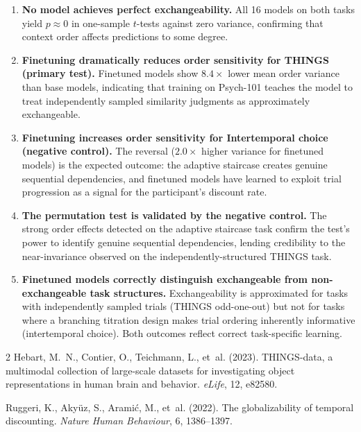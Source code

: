 \documentclass[11pt]{article}
\begin{document}
\begin{enumerate}
    \item \textbf{No model achieves perfect exchangeability.} All 16 models on both tasks yield $p \approx 0$ in one-sample $t$-tests against zero variance, confirming that context order affects predictions to some degree.

    \item \textbf{Finetuning dramatically reduces order sensitivity for THINGS (primary test).} Finetuned models show $8.4\times$ lower mean order variance than base models, indicating that training on Psych-101 teaches the model to treat independently sampled similarity judgments as approximately exchangeable.

    \item \textbf{Finetuning increases order sensitivity for Intertemporal choice (negative control).} The reversal ($2.0\times$ higher variance for finetuned models) is the expected outcome: the adaptive staircase creates genuine sequential dependencies, and finetuned models have learned to exploit trial progression as a signal for the participant's discount rate.

    \item \textbf{The permutation test is validated by the negative control.} The strong order effects detected on the adaptive staircase task confirm the test's power to identify genuine sequential dependencies, lending credibility to the near-invariance observed on the independently-structured THINGS task.

    \item \textbf{Finetuned models correctly distinguish exchangeable from non-exchangeable task structures.} Exchangeability is approximated for tasks with independently sampled trials (THINGS odd-one-out) but not for tasks where a branching titration design makes trial ordering inherently informative (intertemporal choice). Both outcomes reflect correct task-specific learning.
\end{enumerate}


\begin{thebibliography}{2}
Hebart, M.~N., Contier, O., Teichmann, L., et~al. (2023).
\newblock THINGS-data, a multimodal collection of large-scale datasets for investigating object representations in human brain and behavior.
\newblock \textit{eLife}, 12, e82580.

Ruggeri, K., Aky\"{u}z, S., Arami\'{c}, M., et~al. (2022).
\newblock The globalizability of temporal discounting.
\newblock \textit{Nature Human Behaviour}, 6, 1386--1397.
\end{thebibliography}
\end{document}
